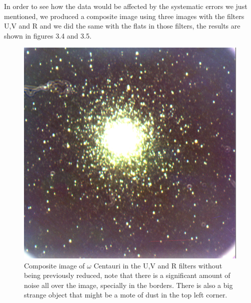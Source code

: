 In order to see how the data would be affected by the systematic errors we just mentioned, we produced a composite image using three images with the filters U,V and R and we did the same with the flats in those filters, the results are shown in figures 3.4 and 3.5.
  
\begin{figure}[H]
  \centering
  \begin{minipage}[b]{0.47\textwidth}
    \includegraphics[width=\textwidth]{images/ngc_5139_dirty.png}
    \caption[Dirty image of NGC5139]{Composite image of $\omega$ Centauri in the U,V and R filters without being previously reduced, note that there is a significant amount of noise all over the image, specially in the borders. There is also a big strange object that might be a mote of dust in the top left corner.}
  \end{minipage}
  \hfill
  \begin{minipage}[b]{0.47\textwidth}

\end{minipage}
\end{figure}

